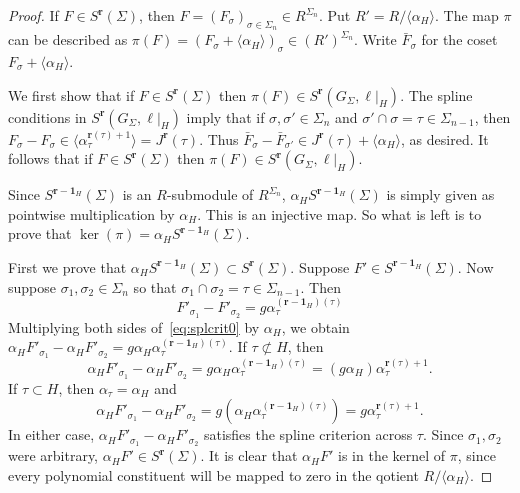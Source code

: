 \documentclass[11pt, reqno]{amsart}
\newcommand{\br}{\mathbf{r}}
\theoremstyle{definition}
\theoremstyle{remark}
\numberwithin{equation}{section}
\begin{document}
\begin{proof}
If $F\in S^{\br}(\Sigma)$, then $F=(F_\sigma)_{\sigma\in\Sigma_n}\in R^{\Sigma_n}$.  Put $R'=R/\langle \alpha_H\rangle$.  The map $\pi$ can be described as $\pi(F)=(F_{\sigma}+\langle \alpha_H\rangle)_{\sigma}\in (R')^{\Sigma_n}$.  Write $\bar{F}_{\sigma}$ for the coset $F_{\sigma}+\langle \alpha_H\rangle$.

We first show that if $F\in S^{\br}(\Sigma)$ then $\pi(F)\in S^{\br}(G_{\Sigma},\ell|_H)$.
The spline conditions in $S^{\br}(G_{\Sigma},\ell|_H)$ imply that if $\sigma,\sigma'\in\Sigma_n$ and $\sigma'\cap\sigma=\tau\in\Sigma_{n-1}$, then $F_{\sigma}-F_{\sigma}\in\langle \alpha_{\tau}^{\br(\tau)+1}\rangle=J^{\br}(\tau)$.  Thus $\bar{F}_{\sigma}-\bar{F}_{\sigma'}\in J^{\br}(\tau)+\langle \alpha_H \rangle$, as desired.  It follows that if $F\in S^{\br}(\Sigma)$ then $\pi(F)\in S^{\br}(G_{\Sigma},\ell|_H)$.

Since $S^{\br-\mathbf{1}_H}(\Sigma)$ is an $R$-submodule of $R^{\Sigma_n}$, $\alpha_HS^{\br-\mathbf{1}_H}(\Sigma)$ is simply given as pointwise multiplication by $\alpha_H$.  This is an injective map.  So what is left is to prove that  $\ker(\pi)=\alpha_HS^{\br-\mathbf{1}_H}(\Sigma)$.

First we prove that $\alpha_HS^{\br-\mathbf{1}_H}(\Sigma)\subset S^{\br}(\Sigma)$.  Suppose $F'\in S^{\br-\mathbf{1}_H}(\Sigma)$.  Now suppose $\sigma_1,\sigma_2\in\Sigma_n$ so that $\sigma_1\cap\sigma_2=\tau\in\Sigma_{n-1}$.  Then
\begin{equation}\label{eq:splcrit0}
F'_{\sigma_1}-F'_{\sigma_2}=g\alpha_{\tau}^{(\br-\mathbf{1}_H)(\tau)}
\end{equation}
Multiplying both sides of~\eqref{eq:splcrit0} by $\alpha_H$, we obtain $\alpha_HF'_{\sigma_1}-\alpha_HF'_{\sigma_2}=g\alpha_H\alpha_{\tau}^{(\br-\mathbf{1}_H)(\tau)}$.  If $\tau\not\subset H$, then 
\[
\alpha_HF'_{\sigma_1}-\alpha_HF'_{\sigma_2}=g\alpha_H\alpha_{\tau}^{(\br-\mathbf{1}_H)(\tau)}=(g\alpha_H)\alpha_{\tau}^{\br(\tau)+1}.
\]
If $\tau\subset H$, then $\alpha_\tau=\alpha_H$ and
\[
\alpha_HF'_{\sigma_1}-\alpha_HF'_{\sigma_2}=g(\alpha_H\alpha_{\tau}^{(\br-\mathbf{1}_H)(\tau)})=g\alpha_{\tau}^{\br(\tau)+1}.
\]
In either case, $\alpha_HF'_{\sigma_1}-\alpha_HF'_{\sigma_2}$ satisfies the spline criterion across $\tau$.  Since $\sigma_1,\sigma_2$ were arbitrary, $\alpha_H F'\in S^{\br}(\Sigma)$.  It is clear that $\alpha_H F'$ is in the kernel of $\pi$, since every polynomial constituent will be mapped to zero in the qotient $R/\langle \alpha_H\rangle$.


\end{proof}
\end{document}
